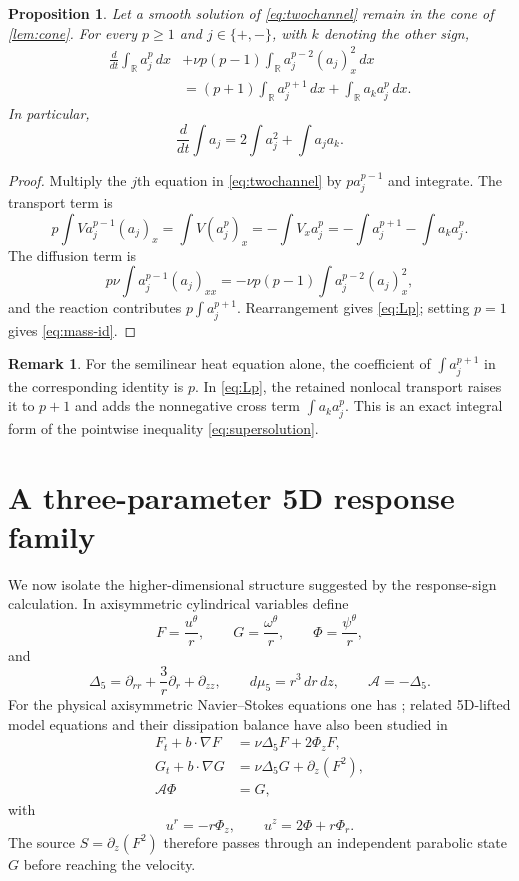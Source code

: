 \documentclass[11pt]{article}
\newtheorem{proposition}[theorem]{Proposition}
\theoremstyle{definition}
\newtheorem{remark}[theorem]{Remark}
\newcommand{\R}{\mathbb R}
\newcommand{\A}{\mathcal A}
\begin{document}
\begin{proposition}\label{prop:Lp}
Let a smooth solution of \eqref{eq:twochannel} remain in the cone of \cref{lem:cone}.  For every $p\ge1$ and $j\in\{+,-\}$, with $k$ denoting the other sign,
\begin{align}
 \frac{d}{dt}\int_\R a_j^p\,dx
 &+\nu p(p-1)\int_\R a_j^{p-2}(a_j)_x^2\,dx\nonumber\\
 &=(p+1)\int_\R a_j^{p+1}\,dx
 +\int_\R a_k a_j^p\,dx.\label{eq:Lp}
\end{align}
In particular,
\begin{equation}\label{eq:mass-id}
 \frac{d}{dt}\int a_j
 =2\int a_j^2+\int a_ja_k.
\end{equation}
\end{proposition}

\begin{proof}
Multiply the $j$th equation in \eqref{eq:twochannel} by $pa_j^{p-1}$ and integrate.  The transport term is
\[
 p\int Va_j^{p-1}(a_j)_x
 =\int V(a_j^p)_x
 =-\int V_xa_j^p
 =-\int a_j^{p+1}-\int a_ka_j^p.
\]
The diffusion term is
\[
 p\nu\int a_j^{p-1}(a_j)_{xx}
 =-\nu p(p-1)\int a_j^{p-2}(a_j)_x^2,
\]
and the reaction contributes $p\int a_j^{p+1}$.  Rearrangement gives \eqref{eq:Lp}; setting $p=1$ gives \eqref{eq:mass-id}.
\end{proof}

\begin{remark}
For the semilinear heat equation alone, the coefficient of $\int a_j^{p+1}$ in the corresponding identity is $p$.  In \eqref{eq:Lp}, the retained nonlocal transport raises it to $p+1$ and adds the nonnegative cross term $\int a_ka_j^p$.  This is an exact integral form of the pointwise inequality \eqref{eq:supersolution}.
\end{remark}

\section{A three-parameter 5D response family}

We now isolate the higher-dimensional structure suggested by the response-sign calculation.  In axisymmetric cylindrical variables define
\[
 F=\frac{u^\theta}{r},
 \qquad
 G=\frac{\omega^\theta}{r},
 \qquad
 \Phi=\frac{\psi^\theta}{r},
\]
and
\[
 \Delta_5=\partial_{rr}+\frac3r\partial_r+\partial_{zz},
 \qquad
 d\mu_5=r^3\,dr\,dz,
 \qquad
 \A=-\Delta_5.
\]
For the physical axisymmetric Navier--Stokes equations one has \cite{HouLi2008,HouWang2024}; related 5D-lifted model equations and their dissipation balance have also been studied in \cite{TaoWu2012}
\begin{align}
 F_t+b\cdot\nabla F&=\nu\Delta_5F+2\Phi_zF,\label{eq:physicalF}\\
 G_t+b\cdot\nabla G&=\nu\Delta_5G+\partial_z(F^2),\label{eq:physicalG}\\
 \A\Phi&=G,\label{eq:physicalPhi}
\end{align}
with
\begin{equation}\label{eq:physicalb}
 u^r=-r\Phi_z,
 \qquad
 u^z=2\Phi+r\Phi_r.
\end{equation}
The source $S=\partial_z(F^2)$ therefore passes through an independent parabolic state $G$ before reaching the velocity.
\end{document}
